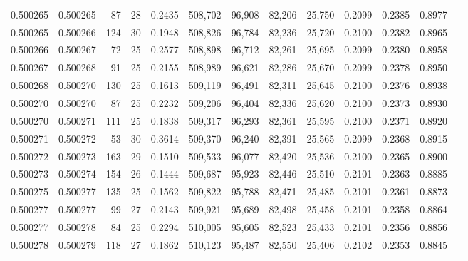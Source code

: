 \begin{tabular}{rrrrrrrrrrrrr}
0.500265 & 0.500265 &  87 &  28 &                                     0.2435 & 508,702 &  96,908 &  82,206 &  25,750 & 0.2099 & 0.2385 & 0.8977 \\
0.500265 & 0.500266 & 124 &  30 &                                     0.1948 & 508,826 &  96,784 &  82,236 &  25,720 & 0.2100 & 0.2382 & 0.8965 \\
0.500266 & 0.500267 &  72 &  25 &                                     0.2577 & 508,898 &  96,712 &  82,261 &  25,695 & 0.2099 & 0.2380 & 0.8958 \\
0.500267 & 0.500268 &  91 &  25 &                                     0.2155 & 508,989 &  96,621 &  82,286 &  25,670 & 0.2099 & 0.2378 & 0.8950 \\
0.500268 & 0.500270 & 130 &  25 &                                     0.1613 & 509,119 &  96,491 &  82,311 &  25,645 & 0.2100 & 0.2376 & 0.8938 \\
0.500270 & 0.500270 &  87 &  25 &                                     0.2232 & 509,206 &  96,404 &  82,336 &  25,620 & 0.2100 & 0.2373 & 0.8930 \\
0.500270 & 0.500271 & 111 &  25 &                                     0.1838 & 509,317 &  96,293 &  82,361 &  25,595 & 0.2100 & 0.2371 & 0.8920 \\
0.500271 & 0.500272 &  53 &  30 &                                     0.3614 & 509,370 &  96,240 &  82,391 &  25,565 & 0.2099 & 0.2368 & 0.8915 \\
0.500272 & 0.500273 & 163 &  29 &                                     0.1510 & 509,533 &  96,077 &  82,420 &  25,536 & 0.2100 & 0.2365 & 0.8900 \\
0.500273 & 0.500274 & 154 &  26 &                                     0.1444 & 509,687 &  95,923 &  82,446 &  25,510 & 0.2101 & 0.2363 & 0.8885 \\
0.500275 & 0.500277 & 135 &  25 &                                     0.1562 & 509,822 &  95,788 &  82,471 &  25,485 & 0.2101 & 0.2361 & 0.8873 \\
0.500277 & 0.500277 &  99 &  27 &                                     0.2143 & 509,921 &  95,689 &  82,498 &  25,458 & 0.2101 & 0.2358 & 0.8864 \\
0.500277 & 0.500278 &  84 &  25 &                                     0.2294 & 510,005 &  95,605 &  82,523 &  25,433 & 0.2101 & 0.2356 & 0.8856 \\
0.500278 & 0.500279 & 118 &  27 &                                     0.1862 & 510,123 &  95,487 &  82,550 &  25,406 & 0.2102 & 0.2353 & 0.8845 \\

\end{tabular}
